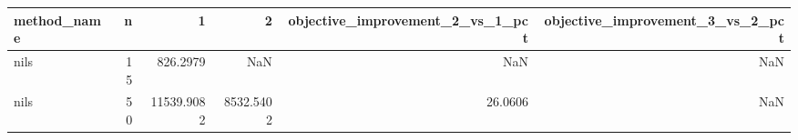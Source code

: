 \begin{tabular}{lrrrrr}
\toprule
method_name & n & 1 & 2 & objective_improvement_2_vs_1_pct & objective_improvement_3_vs_2_pct \\
\midrule
nils & 15 & 826.2979 & NaN & NaN & NaN \\
nils & 50 & 11539.9082 & 8532.5402 & 26.0606 & NaN \\
\bottomrule
\end{tabular}

